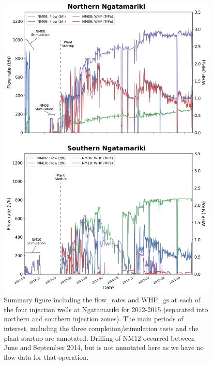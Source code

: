 \begin{figure}[h!]
\begin{center}
\includegraphics[width=0.84\columnwidth]{Chapter_1_Intro/figures/NgaN_ALL_flows_WHP/Ngatamariki_overview_Intro}
\caption[Flow rates and \glspl{WHP_g} at Ngatamariki: 2012--2015]{{
Summary figure including the \glspl{flow_rate} and \glspl{WHP_g} at each
of the four injection wells at Ngatamariki for 2012-2015 (separated into
northern and southern injection zones). The main periods of interest,
including the three completion\slash{stimulation} tests and the plant startup
are annotated. Drilling of NM12 occurred between June and September 2014, but is not annotated here as we have no flow data for that operation.
{\label{953396}}%
}}
\end{center}
\end{figure}

